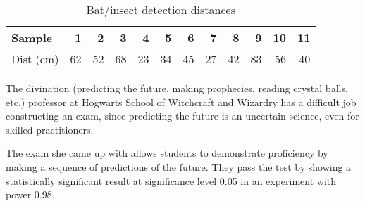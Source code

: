 \documentclass[letterpaper, landscape]{exam}
\begin{document}
\begin{questions}
      \begin{table}[H]
        \centering
        \begin{tabular}{lrrrrrrrrrrr}
          \toprule
          Sample    & 1  & 2  & 3  & 4  & 5  & 6  & 7  & 8  & 9  & 10 & 11 \\
          \midrule
          Dist (cm) & 62 & 52 & 68 & 23 & 34 & 45 & 27 & 42 & 83 & 56 & 40 \\
          \bottomrule
        \end{tabular}
        \caption{Bat/insect detection distances}\label{tab:bats}
      \end{table}


    \question{}

    \question{} The divination (predicting the future, making prophecies,
    reading crystal balls, etc.) professor at Hogwarts School of Witchcraft
    and Wizardry has a difficult job constructing an exam, since predicting
    the future is an uncertain science, even for skilled practitioners.

    The exam she came up with allows students to demonstrate proficiency by
    making a sequence of predictions of the future. They pass the test by
    showing a statistically significant result at significance level 0.05 
    in an experiment with power 0.98.


\end{questions}
\end{document}
